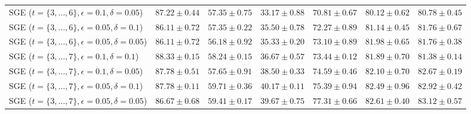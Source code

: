 \documentclass[journal]{IEEEtran}
\theoremstyle{definition}
\begin{document}
\begin{table*}[!t]
\begin{center}
{\begin{tabular}{|l|c|c|c|c|c|c|}
SGE ($t=\lbrace 3,\dots,6 \rbrace, \epsilon = 0.1, \delta = 0.05$) & $87.22\pm 0.44$ & $57.35\pm 0.75$ & $33.17\pm 0.88$ & $70.81\pm 0.67$ & $80.12\pm 0.62$ & $80.78\pm 0.45$ \\
SGE ($t=\lbrace 3,\dots,6 \rbrace, \epsilon = 0.05, \delta = 0.1$) & $86.11\pm 0.72$ & $57.35\pm 0.22$ & $35.50\pm 0.78$ & $72.27\pm 0.89$ & $81.14\pm 0.45$ & $81.76\pm 0.67$ \\
SGE ($t=\lbrace 3,\dots,6 \rbrace, \epsilon = 0.05, \delta = 0.05$) & $86.11\pm 0.72$ & $56.18\pm 0.92$ & $35.33\pm 0.20$ & $73.10\pm 0.89$ & $81.98\pm 0.65$ & $81.76\pm 0.38$ \\
\hline
SGE ($t=\lbrace 3,\dots,7 \rbrace, \epsilon = 0.1, \delta = 0.1$) & $88.33\pm 0.15$ & $58.24\pm 0.15$ & $36.67\pm 0.57$ & $73.44\pm 0.12$ & $81.89\pm 0.70$ & $81.38\pm 0.14$ \\
SGE ($t=\lbrace 3,\dots,7 \rbrace, \epsilon = 0.1, \delta = 0.05$) & $87.78\pm 0.51$ & $57.65\pm 0.91$ & $38.50\pm 0.33$ & $74.59\pm 0.46$ & $82.10\pm 0.70$ & $82.67\pm 0.19$ \\
SGE ($t=\lbrace 3,\dots,7 \rbrace, \epsilon = 0.05, \delta = 0.1$) & $87.78\pm 0.11$ & $59.71\pm 0.36$ & $40.17\pm 0.11$ & $75.39\pm 0.94$ & $82.49\pm 0.96$ & $82.92\pm 0.42$ \\
SGE ($t=\lbrace 3,\dots,7 \rbrace, \epsilon = 0.05, \delta = 0.05$) & $86.67\pm 0.68$ & $59.41\pm 0.17$ & $39.67\pm 0.75$ & $\mathbf{77.31\pm 0.66}$ & $\mathbf{82.61\pm 0.40}$ & $\mathbf{83.12\pm 0.57}$ \\
\hline
\end{tabular}}
\end{center}
\end{table*}
\end{document}
